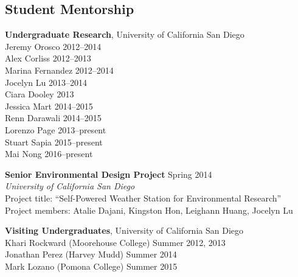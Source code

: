 \documentclass[]{res}
\begin{document}
\begin{resume}
\section{Student Mentorship}
\vspace{0.1in}

\textbf{Undergraduate Research}, University of California San Diego \\
Jeremy Orosco \hfill 2012--2014 \\
Alex Corliss \hfill 2012--2013 \\
Marina Fernandez \hfill 2012--2014 \\
Jocelyn Lu \hfill 2013--2014 \\
Ciara Dooley \hfill 2013 \\
Jessica Mart \hfill 2014--2015 \\
Renn Darawali \hfill 2014--2015 \\
Lorenzo Page \hfill 2013--present \\
Stuart Sapia \hfill 2015--present \\
Mai Nong \hfill 2016--present

\textbf{Senior Environmental Design Project} \hfill Spring 2014 \\
\textit{University of California San Diego} \\
Project title: ``Self-Powered Weather Station for Environmental Research'' \\
Project members: Atalie Dajani, Kingston Hon, Leighann Huang, Jocelyn Lu

%

\textbf{Visiting Undergraduates}, University of California San Diego \\
Khari Rockward (Moorehouse College) \hfill Summer 2012, 2013 \\
Jonathan Perez (Harvey Mudd) \hfill Summer 2014 \\
Mark Lozano (Pomona College) \hfill Summer 2015


\end{resume}
\end{document}

